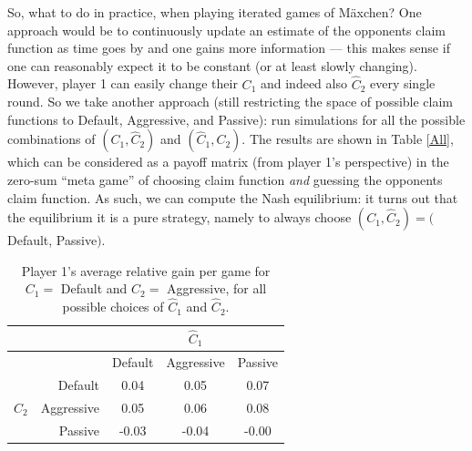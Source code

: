 \documentclass[12pt]{article}
\begin{document}
So, what to do in practice, when playing iterated games of M\"{a}xchen? One approach would be to continuously update an estimate of the opponents claim function as time goes by and one gains more information --- this makes sense if one can reasonably expect it to be constant (or at least slowly changing). However, player 1 can easily change their $C_1$ and indeed also $\hat{C}_2$ every single round. So we take another approach (still restricting the space of possible claim functions to Default, Aggressive, and Passive): run simulations for all the possible combinations of $(C_1,\hat{C}_2)$ and $(\hat{C}_1,C_2)$. The results are shown in Table \ref{All}, which can be considered as a payoff matrix (from player 1's perspective) in the zero-sum ``meta game'' of choosing claim function \emph{and} guessing the opponents claim function. As such, we can compute the Nash equilibrium: it turns out that the equilibrium it is a pure strategy, namely to always choose $(C_1, \hat{C}_2) = ($Default, Passive$)$.

\begin{table}[h!]

  \begin{center}
  
    \begin{tabular}{c|rccc} %
      &&&$\hat{C}_1$&\\
	  \hline
	  && Default & Aggressive & Passive\\
	 &Default & 0.04& 0.05 & 0.07 \\ 
$\hat{C}_2$&Aggressive & 0.05&0.06&0.08\\ 
&Passive & -0.03&-0.04&-0.00\\
    \end{tabular}
  \end{center}
  \caption{Player 1's average relative gain per game for $C_1 = $ Default and $C_2 = $ Aggressive, for all possible choices of $\hat{C}_1$ and $\hat{C}_2$.}
  \label{Private}
\end{table}
\end{document}
